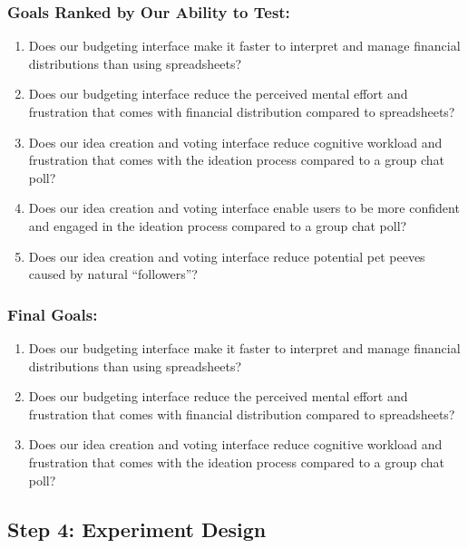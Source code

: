 \documentclass[12pt,a4paper]{article}
\begin{document}
\subsubsection{Goals Ranked by Our Ability to Test:}
\begin{enumerate}
    \item{Does our budgeting interface make it faster to interpret and manage financial distributions than using spreadsheets? }
    \item{Does our budgeting interface reduce the perceived mental effort and frustration that comes with financial distribution compared to spreadsheets?}
    \item{Does our idea creation and voting interface reduce cognitive workload and frustration that comes with the ideation process compared to a group chat poll?}
    \item{Does our idea creation and voting interface enable users to be more confident and  engaged in the ideation process compared to a group chat poll?}
    \item{Does our idea creation and voting interface reduce potential pet peeves caused by natural “followers”?}
\end{enumerate}

\subsubsection{Final Goals:}
\begin{enumerate}
    \item{Does our budgeting interface make it faster to interpret and manage financial distributions than using spreadsheets? }
    \item{Does our budgeting interface reduce the perceived mental effort and frustration that comes with financial distribution compared to spreadsheets?}
    \item{Does our idea creation and voting interface reduce cognitive workload and frustration that comes with the ideation process compared to a group chat poll?}
\end{enumerate}


\newpage

\subsection{Step 4: Experiment Design}
\end{document}
